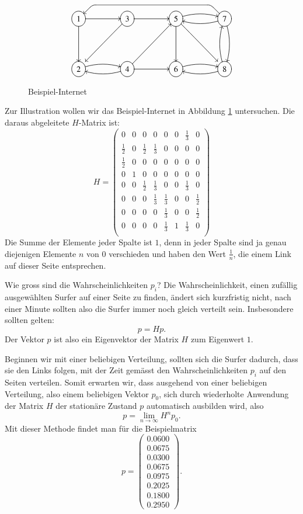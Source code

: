 \begin{figure}
\[\UseTips
\entrymodifiers={++[o][F]}
\xymatrix @=1.5cm {
1 \ar[r] \ar[d]
	& 3 \ar[r] \ar@(dl,dl)[dl]
		& 5 \ar[d] \ar@/^/[r] \ar@(dr,dr)[rd]
			& 7 \ar@/^/[d]  \ar@/^/[l]
\ar `ul^l[lll]+/u6mm/`l^dl[lll] [lll]
\\
2 \ar@/^/[r]
	& 4 \ar@/^/[l] \ar[r] \ar[ur]
		& 6 \ar@/^/[r]
			& 8 \ar@/^/[l] \ar@/^/[u]
}
\]
\caption{Beispiel-Internet\label{google-sample}}
\end{figure}
Zur Illustration wollen wir das Beispiel-Internet in Abbildung \ref{google-sample}
untersuchen.
Die daraus abgeleitete $H$-Matrix ist:
\[
H=\left(
\begin{matrix}
0&0&0&0&0&0&\frac13&0\\
\frac12&0&\frac12&\frac13&0&0&0&0\\
\frac12&0&0&0&0&0&0&0\\
0&1&0&0&0&0&0&0\\
0&0&\frac12&\frac13&0&0&\frac13&0\\
0&0&0&\frac13&\frac13&0&0&\frac12\\
0&0&0&0&\frac13&0&0&\frac12\\
0&0&0&0&\frac13&1&\frac13&0\\
\end{matrix}
\right)
\]
Die Summe der Elemente jeder Spalte ist $1$, denn in jeder Spalte sind ja genau
diejenigen Elemente $n$ von $0$ verschieden und haben den Wert $\frac1n$,
die einem Link auf dieser Seite entsprechen.

Wie gross sind die Wahrscheinlichkeiten $p_i$? Die Wahrscheinlichkeit, einen zufällig
ausgewählten Surfer auf einer Seite zu finden, ändert sich kurzfristig nicht, nach
einer Minute sollten also die Surfer immer noch gleich verteilt sein.
Insbesondere
sollten gelten:
\[
p=Hp.
\]
Der Vektor $p$ ist also ein Eigenvektor der Matrix $H$ zum Eigenwert $1$.

Beginnen wir mit einer beliebigen Verteilung, sollten sich die Surfer dadurch,
dass sie den Links folgen, mit der Zeit gemässt den Wahrscheinlichkeiten $p_i$
auf den Seiten verteilen.
Somit erwarten wir, dass ausgehend von einer beliebigen
Verteilung, also einem beliebigen Vektor $p_0$, sich durch wiederholte Anwendung der
Matrix $H$ der stationäre Zustand $p$ automatisch ausbilden wird, also
\[
p=\lim_{n\to\infty}H^np_0.
\]
Mit dieser Methode findet man für die Beispielmatrix
\[
p=\left(
\begin{matrix}
0.0600\\0.0675\\0.0300\\0.0675\\0.0975\\0.2025\\0.1800\\0.2950
\end{matrix}
\right).
\]

